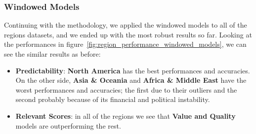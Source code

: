 \documentclass[11pt,english,a4paper,hidelinks]{book}
\begin{document}
\subsubsection{Windowed Models}
\noindent Continuing with the methodology, we applied the windowed models to all of the regions datasets, and we ended up with the most robust results so far. Looking at the performances in figure~\ref{fig:region_performance_windowed_models}, we can see the similar results as before:  

\begin{itemize}
    \item \textbf{Predictability}: \textbf{North America} has the best performances and accuracies. On the other side,  \textbf{Asia \& Oceania} and \textbf{Africa \& Middle East} have the worst performances and accuracies; the first due to their outliers and the second probably because of its financial and political instability.
    \item \textbf{Relevant Scores}: in all of the regions we see that \textbf{Value and Quality} models are outperforming the rest.
\end{itemize}
\end{document}
